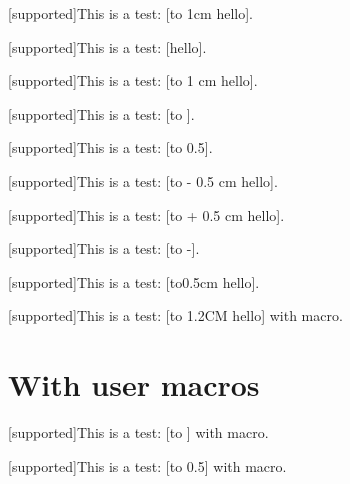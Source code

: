 \documentclass{revtex4-1}
\def\Supported{{\color{darkgreen} [supported]}}
\begin{document}
\Supported This is a test: [\hbox to 1cm {hello}].

\Supported This is a test: [\hbox {hello}].





\Supported This is a test: [\hbox to 1 cm {hello}]. %

\Supported This is a test: [\hbox to \textwidth {hello}]. %

\Supported This is a test: [\hbox to 0.5\textwidth {hello}]. %


\Supported This is a test: [\hbox to - 0.5 cm {hello}]. %

\Supported This is a test: [\hbox to + 0.5 cm {hello}]. %


\Supported This is a test: [\hbox to -\textwidth {hello}]. %

\Supported This is a test: [\hbox to0.5cm {hello}]. %

\Supported This is a test: [\hbox to 1.2CM {hello}] with macro. %



\section{With user macros}

\def\textw{\textwidth}
\Supported This is a test: [\hbox to \textw {hello}] with macro. %

\def\phrase{to 0.5\textwidth}
\Supported This is a test: [\hbox \phrase {hello}] with macro. %
\end{document}
